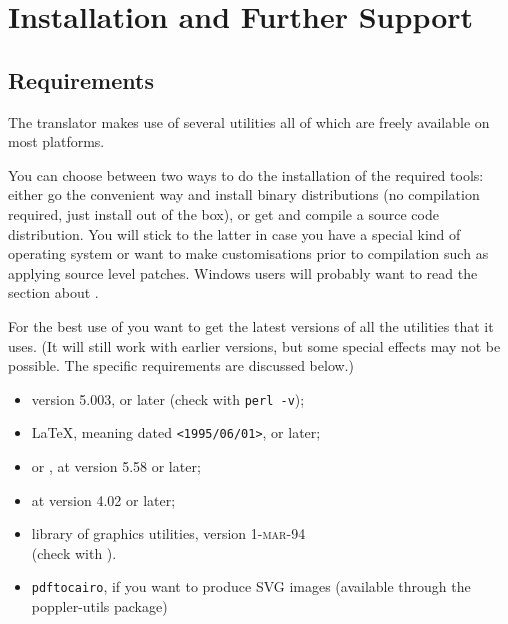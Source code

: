 \section{Installation and Further Support}
\label{sec:sup}
\subsection{Requirements}%
\html{\\}%
The translator makes use of several utilities all of which 
are freely available on most platforms. 

You can choose between two ways to do the installation of the required
tools: either go the convenient way and install binary distributions
(no compilation required, just install out of the box), or get and
compile a source code distribution.
You will stick to the latter in case you have a special kind of
operating system or want to make customisations prior to compilation
such as applying source level patches.
Windows users will probably want to read the section about
.

For the best use of \latextohtml{} you want to get the latest
versions of all the utilities that it uses. (It will still work
with earlier versions, but some  special effects may not be possible. 
The specific requirements are discussed below.)
%
\begin{itemize}
\item \Perl{} version 5.003, or later (check with \verb/perl -v/);
\item \LaTeX, meaning \LaTeXe{} dated \texttt{<1995/06/01>}, or later;
\item {} or , at version 5.58 or later;
\item {} at version 4.02 or later;
\item {} library of graphics utilities, version \textsc{1-mar-94}\\
  (check with  ).
\item \texttt{pdftocairo}, if you want to produce SVG images
      (available through the poppler-utils package)
\end{itemize}

